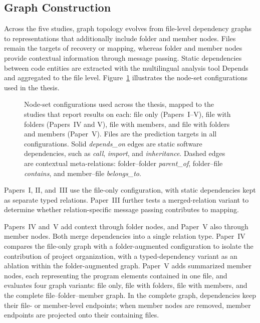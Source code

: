 \subsection{Graph Construction}\label{sec:graph_construction}
Across the five studies, graph topology evolves from file-level dependency graphs to representations that additionally include folder and member nodes. Files remain the targets of recovery or mapping, whereas folder and member nodes provide contextual information through message passing. Static dependencies between code entities are extracted with the multilingual analysis tool Depends~\cite{depends} and aggregated to the file level. Figure~\ref{fig:graph_configs} illustrates the node-set configurations used in the thesis.
\begin{figure}[!thb]
    \centering
    \hspace*{-0.5cm}
    \caption[Node-set configurations used across the thesis.]{\fontsize{9.5pt}{12pt}\selectfont Node-set configurations used across the thesis, mapped to the studies that report results on each: file only (Papers~I--V), file with folders (Papers~IV and V), file with members, and file with folders and members (Paper~V). Files are the prediction targets in all configurations. Solid \emph{depends\_on} edges are static software dependencies, such as \emph{call}, \emph{import}, and \emph{inheritance}. Dashed edges are contextual meta-relations: folder--folder \emph{parent\_of}, folder--file \emph{contains}, and member--file \emph{belongs\_to}.\label{fig:graph_configs}}
\end{figure}

Papers~I, II, and~III use the file-only configuration, with static dependencies kept as separate typed relations. Paper~III further tests a merged-relation variant to determine whether relation-specific message passing contributes to mapping.

Papers~IV and~V add context through folder nodes, and Paper~V also through member nodes. Both merge dependencies into a single relation type. Paper~IV compares the file-only graph with a folder-augmented configuration to isolate the contribution of project organization, with a typed-dependency variant as an ablation within the folder-augmented graph. Paper~V adds summarized member nodes, each representing the program elements contained in one file, and evaluates four graph variants: file only, file with folders, file with members, and the complete file--folder--member graph. In the complete graph, dependencies keep their file- or member-level endpoints; when member nodes are removed, member endpoints are projected onto their containing files.

